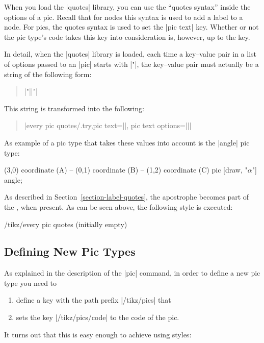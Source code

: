 When you load the |quotes| library, you can use the ``quotes syntax''
inside the options of a pic. Recall that for nodes this syntax is used
to add a label to a node. For pics, the quotes syntax is used to set
the |pic text| key. Whether or not the pic type's code takes this key
into consideration is, however, up to the key.

In detail, when the |quotes| library is loaded, each time a key--value 
pair in a list of options passed to an |pic| starts with |"|, the
key--value pair must actually be a string of the following form:
\begin{quote}
  |"||"|
\end{quote}
This string is transformed into the following:
\begin{quote}
  |every pic quotes/.try,pic text=||, pic text options={||}|
\end{quote}

As example of a pic type that takes these values into account is the
|angle| pic type:
\begin{codeexample}[]
\tikz \draw (3,0) coordinate (A)
         -- (0,1) coordinate (B)
         -- (1,2) coordinate (C)
            pic [draw, "$\alpha$"] {angle};
\end{codeexample}

As described in Section~\ref{section-label-quotes}, the apostrophe
becomes part of the , when present. As can be seen
above, the following style is executed:
\begin{stylekey}{/tikz/every pic quotes (initially \normalfont empty)}
\end{stylekey}

\subsection{Defining New Pic Types}
\label{section-new-pic-types}

As explained in the description of the |pic| command, in order to
define a new pic type you need to
\begin{enumerate}
\item define a key with the path prefix |/tikz/pics| that
\item sets the key |/tikz/pics/code| to the code of the pic. 
\end{enumerate}

It turns out that this is easy enough to achieve using styles:

